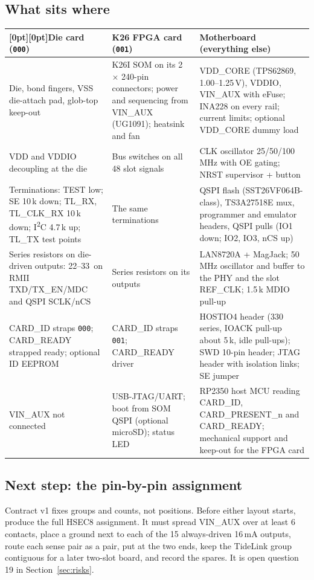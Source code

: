 \documentclass[10pt,a4paper]{article}
\newcommand\hd[1]{\textbf{#1}}
\begin{document}
\subsection{What sits where}\label{sec:partition}
{\footnotesize
\setlength{\tabcolsep}{4pt}
\begin{longtable}{@{}P{4.9cm}P{5.3cm}P{5.8cm}@{}}
\toprule
{}[0pt][0pt]\hd{Die card (\texttt{000})} & \hd{K26 FPGA card (\texttt{001})} & \hd{Motherboard (everything else)}\\
\midrule
\endhead
Die, bond fingers, VSS die-attach pad, glob-top keep-out & K26I SOM on its 2 $\times$ 240-pin connectors; power and sequencing from VIN\_AUX (UG1091); heatsink and fan & VDD\_CORE (TPS62869, 1.00--1.25\,V), VDDIO, VIN\_AUX with eFuse; INA228 on every rail; current limits; optional VDD\_CORE dummy load \\
VDD and VDDIO decoupling at the die & Bus switches on all 48 slot signals & CLK oscillator 25/50/100\,MHz with OE gating; NRST supervisor + button \\
Terminations: TEST low; SE 10\,k\textohm{} down; TL\_RX, TL\_CLK\_RX 10\,k\textohm{} down; I\textsuperscript{2}C 4.7\,k\textohm{} up; TL\_TX test points & The same terminations & QSPI flash (SST26VF064B-class), TS3A27518E mux, programmer and emulator headers, QSPI pulls (IO1 down; IO2, IO3, nCS up) \\
Series resistors on die-driven outputs: 22--33\,\textohm{} on RMII TXD/TX\_EN/MDC and QSPI SCLK/nCS & Series resistors on its outputs & LAN8720A + MagJack; 50\,MHz oscillator and buffer to the PHY and the slot REF\_CLK; 1.5\,k\textohm{} MDIO pull-up \\
CARD\_ID straps \texttt{000}; CARD\_READY strapped ready; optional ID EEPROM & CARD\_ID straps \texttt{001}; CARD\_READY driver & HOSTIO4 header (330\,\textohm{} series, IOACK pull-up about 5\,k\textohm{}, idle pull-ups); SWD 10-pin header; JTAG header with isolation links; SE jumper \\
VIN\_AUX not connected & USB-JTAG/UART; boot from SOM QSPI (optional microSD); status LED & RP2350 host MCU reading CARD\_ID, CARD\_PRESENT\_n and CARD\_READY; mechanical support and keep-out for the FPGA card \\
\bottomrule
\end{longtable}\addtocounter{table}{-1}}

\subsection{Next step: the pin-by-pin assignment}\label{sec:slotnext}
Contract v1 fixes groups and counts, not positions. Before either layout starts, produce the full HSEC8 assignment. It must spread VIN\_AUX over at least 6 contacts, place a ground next to each of the 15 always-driven 16\,mA outputs, route each sense pair as a pair, put  at the two ends, keep the TideLink group contiguous for a later two-slot board, and record the spares. It is open question 19 in Section~\ref{sec:risks}.
\end{document}
